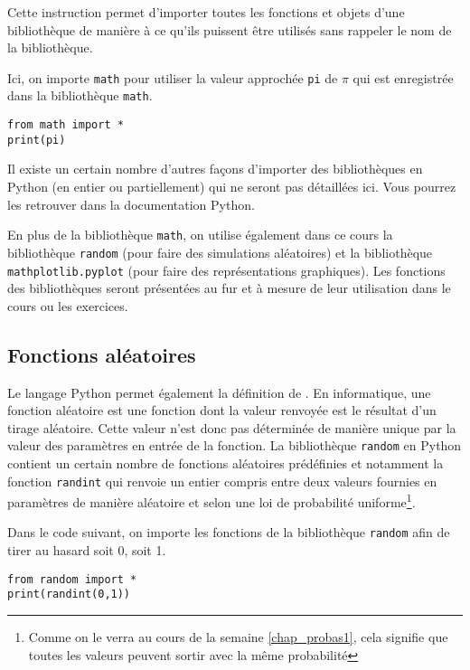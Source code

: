 Cette instruction permet d'importer toutes les fonctions et objets d'une bibliothèque de manière à ce qu'ils puissent être utilisés sans rappeler le nom de la bibliothèque.
\begin{example}
	Ici, on importe \texttt{math} pour utiliser la valeur approchée \texttt{pi} de $\pi$ qui est enregistrée dans la bibliothèque \texttt{math}.
\begin{center}
	\begin{varwidth}[t]{.5\textwidth}
		\begin{lstlisting}[language=iPython,linewidth = 5cm]
from math import *
print(pi)
\end{lstlisting}\end{varwidth}\end{center}
\end{example}
Il existe un certain nombre d'autres façons d'importer des bibliothèques en Python (en entier ou partiellement) qui ne seront pas détaillées ici. Vous pourrez les retrouver dans la documentation Python.

En plus de la bibliothèque \texttt{math}, on utilise également dans ce cours la bibliothèque \texttt{random} (pour faire des simulations aléatoires) et la bibliothèque \texttt{mathplotlib.pyplot} (pour faire des représentations graphiques). Les fonctions des bibliothèques seront présentées au fur et à mesure de leur utilisation dans le cours ou les exercices.

\subsection{Fonctions aléatoires}

Le langage Python permet également la définition de . En informatique, une fonction aléatoire est une fonction dont la valeur renvoyée est le résultat d'un tirage aléatoire. Cette valeur n'est donc pas déterminée de manière unique par la valeur des paramètres en entrée de la fonction. La bibliothèque \texttt{random} en Python contient un certain nombre de fonctions aléatoires prédéfinies et notamment la fonction \texttt{randint} qui renvoie un entier compris entre deux valeurs fournies en paramètres de manière aléatoire et selon une loi de probabilité uniforme\footnote{Comme on le verra au cours de la semaine \ref{chap_probas1}, cela signifie que toutes les valeurs peuvent sortir avec la même probabilité}.

\begin{example}
	Dans le code suivant, on importe les fonctions de la bibliothèque \texttt{random} afin de tirer au hasard soit 0, soit 1.
\begin{center}
	\begin{varwidth}[t]{.5\textwidth}
		\begin{lstlisting}[language=iPython,linewidth = 6cm]
from random import *
print(randint(0,1))
\end{lstlisting}\end{varwidth}\end{center}
\end{example}

